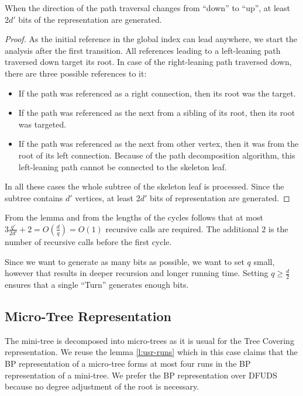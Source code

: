 \begin{lemma}
	When the direction of the path traversal changes from ``down'' to ``up'', at least $2d'$ bits of the representation are generated.
\end{lemma}
\begin{proof}
	As the initial reference in the global index can lead anywhere, we start the analysis after the first transition.
	All references leading to a left-leaning path traversed down target its root.
	In case of the right-leaning path traversed down, there are three possible references to it:
	\begin{itemize}
		\item If the path was referenced as a right connection, then its root was the target.
		\item If the path was referenced as the next from a sibling of its root, then its root was targeted.
		\item If the path was referenced as the next from other vertex, then it was from the root of its left connection.
		Because of the path decomposition algorithm, this left-leaning path cannot be connected to the skeleton leaf.
	\end{itemize}

	In all these cases the whole subtree of the skeleton leaf is processed.
	Since the subtree contains $d'$ vertices, at least $2d'$ bits of representation are generated.
\end{proof}

From the lemma and from the lengths of the cycles follows that at most $3 \frac{q'}{2d'} + 2 = O\left(\frac{d}{q}\right) = O(1)$ recursive calls are required.
The additional $2$ is the number of recursive calls before the first cycle.

Since we want to generate as many bits as possible, we want to set $q$ small, however that results in deeper recursion and longer running time.
Setting $q \ge \frac{d}{2}$ ensures that a single ``Turn'' generates enough bits.

\subsection{Micro-Tree Representation}

The mini-tree is decomposed into micro-trees as it is usual for the Tree Covering representation.
We reuse the lemma \ref{l:usr-runs} which in this case claims that the BP representation of a micro-tree forms at most four runs in the BP representation of a mini-tree.
We prefer the BP representation over DFUDS because no degree adjustment of the root is necessary.

